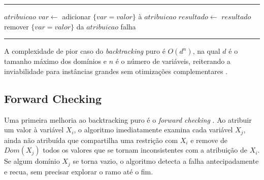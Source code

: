 \begin{algorithm}[hbtp]
  \caption{Algoritmo de Busca por Backtracking para CSP}\label{alg:backtracking}
  \vspace{2mm} %
  \hrule %
  \vspace{2mm} %

  \begin{algorithmic}[1]
    \State \Return {}
    \EndFunction
    \Statex
    \State \Return $atribuicao$
    \EndIf
    \State $var \gets$ 
    \State adicionar $\{var = valor\}$ à $atribuicao$
    \State $resultado \gets$ 
    \State \Return $resultado$
    \EndIf
    \State remover $\{var = valor\}$ da $atribuicao$
    \EndIf
    \EndFor
    \State \Return falha
    \EndFunction
  \end{algorithmic}

  \vspace{2mm}
  \hrule %
  \vspace{2mm}
\end{algorithm}


A complexidade de pior caso do \textit{backtracking} puro é $O(d^n)$, na qual $d$ é o tamanho
máximo dos domínios e $n$ é o número de variáveis, reiterando a inviabilidade para instâncias grandes
sem otimizações complementares \cite{Russell2010}.

\subsection{Forward Checking}
Uma primeira melhoria ao backtracking puro é o \textit{forward checking} \cite{Dechter2003}.
Ao atribuir um valor à variável $X_i$, o algoritmo imediatamente examina cada variável $X_j$, ainda
não atribuída que compartilha uma restrição com $X_i$ e remove de $Dom(X_j)$ todos os valores que se tornam
inconsistentes com a atribuição de $X_i$. Se algum domínio $X_j$ se torna vazio, o algoritmo detecta
a falha antecipadamente e recua, sem precisar explorar o ramo até o fim.

